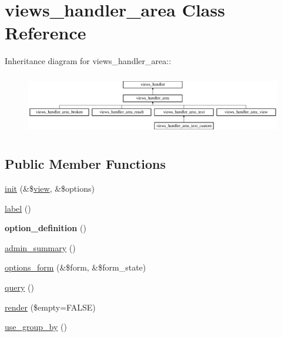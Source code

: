 \hypertarget{classviews__handler__area}{
\section{views\_\-handler\_\-area Class Reference}
\label{classviews__handler__area}
}
Inheritance diagram for views\_\-handler\_\-area::\begin{figure}[H]
\begin{center}
\leavevmode
\includegraphics[height=2.70531cm]{classviews__handler__area}
\end{center}
\end{figure}
\subsection*{Public Member Functions}
\begin{DoxyCompactItemize}
\item 
\hyperlink{classviews__handler__area_ad3af1ecd94f27a685d79125bd1bae4cb}{init} (\&\$\hyperlink{classview}{view}, \&\$options)
\item 
\hyperlink{classviews__handler__area_ab6ca1a4a9766341b6159e8cad9945564}{label} ()
\item 
\hypertarget{classviews__handler__area_a938939577c4589dcb57aa6974c0ae088}{
{\bfseries option\_\-definition} ()}
\label{classviews__handler__area_a938939577c4589dcb57aa6974c0ae088}

\item 
\hyperlink{classviews__handler__area_a859db27dfc7636cba49b95c2c8920e19}{admin\_\-summary} ()
\item 
\hyperlink{classviews__handler__area_af3615e22fccc744485ddb7978ce812ff}{options\_\-form} (\&\$form, \&\$form\_\-state)
\item 
\hyperlink{classviews__handler__area_a477f0103ba709a41a30d6e1765675b68}{query} ()
\item 
\hyperlink{classviews__handler__area_a9f3eb4b8ee98a0929946e8de7253d302}{render} (\$empty=FALSE)
\item 
\hyperlink{classviews__handler__area_afd0f5987bb450217d97f6fb5607e5f70}{use\_\-group\_\-by} ()
\end{DoxyCompactItemize}


